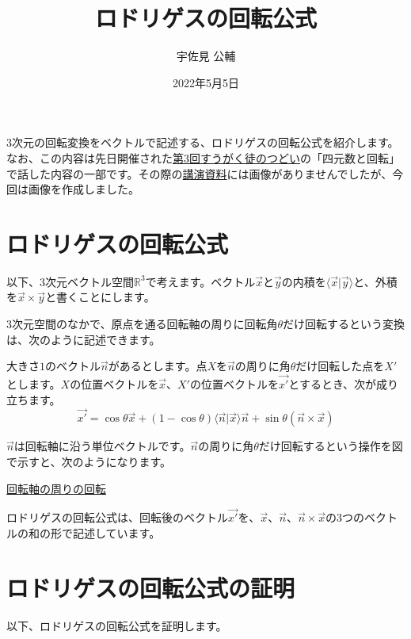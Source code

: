 \documentclass{jlreq}
\title{ロドリゲスの回転公式}
\author{宇佐見 公輔}
\date{2022年5月5日}
\numberwithin{equation}{section}
\begin{document}
\maketitle

3次元の回転変換をベクトルで記述する、ロドリゲスの回転公式を紹介します。なお、この内容は先日開催された\href{https://tsudoionline.netlify.app/03/}{第3回すうがく徒のつどい}の「四元数と回転」で話した内容の一部です。その際の\href{https://github.com/usami-k/mathematics/blob/master/2022/QuaternionRotationTsudoi/QuaternionRotationTsudoi.pdf}{講演資料}には画像がありませんでしたが、今回は画像を作成しました。

\section{ロドリゲスの回転公式}

以下、3次元ベクトル空間$\mathbb{R}^3$で考えます。ベクトル$\vec{x}$と$\vec{y}$の内積を$\langle\vec{x}|\vec{y}\rangle$と、外積を$\vec{x}\times\vec{y}$と書くことにします。

3次元空間のなかで、原点を通る回転軸の周りに回転角$\theta$だけ回転するという変換は、次のように記述できます。

\begin{theorem}[ロドリゲスの回転公式]
    大きさ$1$のベクトル$\vec{n}$があるとします。点$X$を$\vec{n}$の周りに角$\theta$だけ回転した点を$X'$とします。$X$の位置ベクトルを$\vec{x}$、$X'$の位置ベクトルを$\vec{x'}$とするとき、次が成り立ちます。
    \begin{equation}
        \vec{x'}=\cos\theta\vec{x}+(1-\cos\theta)\langle\vec{n}|\vec{x}\rangle\vec{n}+\sin\theta(\vec{n}\times\vec{x})
    \end{equation}
\end{theorem}

$\vec{n}$は回転軸に沿う単位ベクトルです。$\vec{n}$の周りに角$\theta$だけ回転するという操作を図で示すと、次のようになります。

\href{https://mathlog.info/uploads/image/20220505154815.png}{回転軸の周りの回転}

ロドリゲスの回転公式は、回転後のベクトル$\vec{x'}$を、$\vec{x}$、$\vec{n}$、$\vec{n}\times\vec{x}$の3つのベクトルの和の形で記述しています。

\section{ロドリゲスの回転公式の証明}

以下、ロドリゲスの回転公式を証明します。
\end{document}
